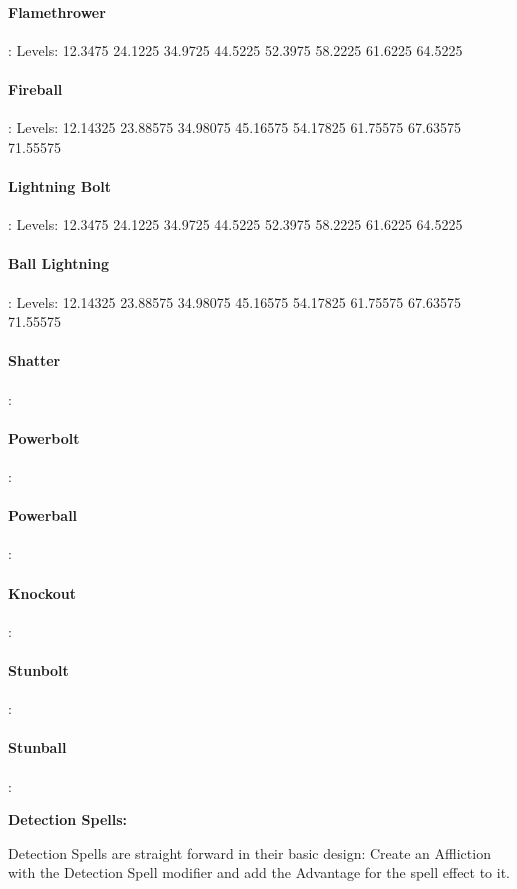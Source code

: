 \begin{multicols*}{2}
	\paragraph{Flamethrower}: Levels: 12.3475 24.1225 34.9725 44.5225 52.3975 58.2225 61.6225 64.5225
	
	\paragraph{Fireball}: Levels: 12.14325 23.88575 34.98075 45.16575 54.17825 61.75575 67.63575 71.55575
	
	\paragraph{Lightning Bolt}: Levels: 12.3475 24.1225 34.9725 44.5225 52.3975 58.2225 61.6225 64.5225
	
	\paragraph{Ball Lightning}: Levels: 12.14325 23.88575 34.98075 45.16575 54.17825 61.75575 67.63575 71.55575
	
	\paragraph{Shatter}:
	\paragraph{Powerbolt}:
	\paragraph{Powerball}:
	\paragraph{Knockout}:
	\paragraph{Stunbolt}:
	\paragraph{Stunball}:
	
	\textbf{Detection Spells:\\}
	
	Detection Spells are straight forward in their basic design: Create an Affliction with the Detection Spell modifier and add the Advantage for the spell effect to it.
	

\end{multicols*}
